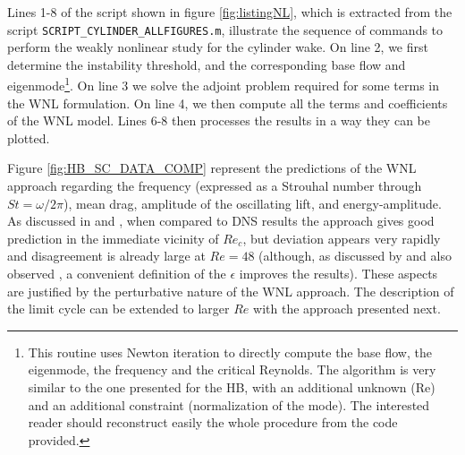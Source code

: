 \documentclass[twocolumn,10pt]{asme2ej}
\begin{document}
Lines 1-8 of the script shown in figure \ref{fig:listingNL}, which is extracted from the script 
\verb|SCRIPT_CYLINDER_ALLFIGURES.m|, illustrate the sequence of commands to 
perform the weakly nonlinear study for the cylinder wake.
On line 2, we first determine the instability threshold, and the corresponding base flow and eigenmode\footnote{This routine uses Newton iteration to directly compute the base flow, the eigenmode, the frequency and the critical Reynolds. The algorithm is very similar to the one presented for the HB, with an additional unknown (Re) and an additional constraint (normalization of the mode). The interested reader should reconstruct easily the whole procedure from the code provided.}. 
On line 3 we solve the adjoint problem required for some terms in the WNL formulation.
On line 4, we then compute all the terms and coefficients of the WNL model.
Lines 6-8 then processes the results in a way they can be plotted.




Figure \ref{fig:HB_SC_DATA_COMP} represent the predictions of the WNL approach regarding the frequency (expressed as a Strouhal number through $St = \omega/2\pi$), mean drag, amplitude of the oscillating lift, and energy-amplitude.
As discussed in \cite{SippLebedev} and \cite{FDR2016},  when compared to DNS results the approach gives good prediction in the immediate vicinity of $Re_c$, but deviation appears very rapidly and disagreement is already large at $Re=48$ (although, as discussed by \cite{FDR2016} and also observed  \cite{Tchoufag2015}, a convenient definition of the $\epsilon$ improves the results). 
 These aspects are justified by the perturbative nature of the WNL approach. The description of the limit cycle can be extended to larger $Re$ with the approach presented next.  
\end{document}

